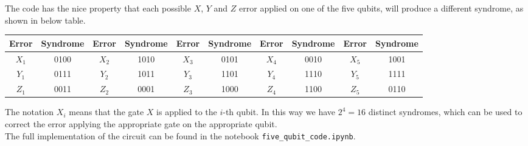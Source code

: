 \documentclass{article}
\begin{document}
 	\noindent The code has the nice property that each possible $X$, $Y$ and $Z$ error applied on one of the five qubits, will produce a different syndrome, as shown in below table. 
 	\begin{table}[H]
 		\centering
 		\begin{tabular}{|c|c||c|c||c|c||c|c||c|c|}
 			\hline
 			Error & Syndrome & Error & Syndrome & Error & Syndrome & Error & Syndrome & Error & Syndrome \\ \hline \hline
 			$X_1$  & 0100 & $X_2$  & 1010 & $X_3$  & 0101 & $X_4$ & 0010 & $X_5$ & 1001 \\ \hline
 			$Y_1$  & 0111 & $Y_2$  & 1011 & $Y_3$  & 1101 & $Y_4$ & 1110 & $Y_5$ & 1111 \\ \hline
 			$Z_1$  & 0011 & $Z_2$  & 0001 & $Z_3$  & 1000 & $Z_4$ & 1100 & $Z_5$ & 0110 \\ \hline
 		\end{tabular}
 	\end{table}
 	\noindent The notation $X_i$ means that the gate $X$ is applied to the $i$-th qubit. In this way we have $2^4 = 16$ distinct syndromes, which can be used to correct the error applying the appropriate gate on the appropriate qubit.\\
 	The full implementation of the circuit can be found in the notebook \verb|five_qubit_code.ipynb|.
	 
	\newpage
	\nocite{devitt2013quantum}
	
	
\end{document}
